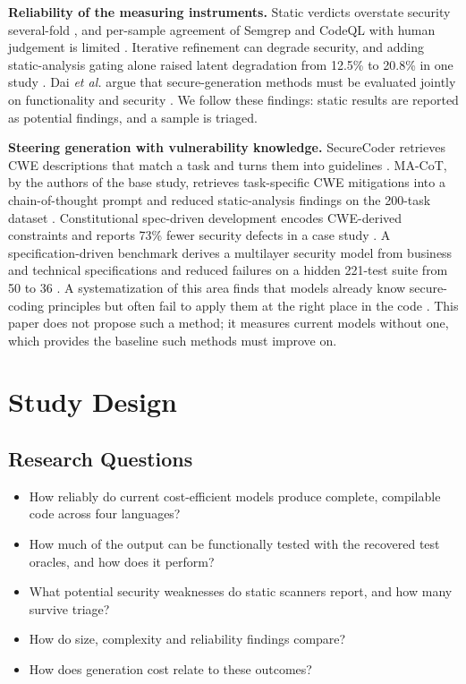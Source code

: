 \documentclass[conference]{IEEEtran}
\begin{document}
\textbf{Reliability of the measuring instruments.} Static verdicts overstate
security several-fold \cite{tessa2026}, and per-sample agreement of Semgrep and
CodeQL with human judgement is limited \cite{firouzi2026}. Iterative refinement
can degrade security, and adding static-analysis gating alone raised latent
degradation from 12.5\% to 20.8\% in one study \cite{scaffold2026}. Dai
\textit{et al.} argue that secure-generation methods must be evaluated jointly
on functionality and security \cite{dai2025}. We follow these findings: static
results are reported as potential findings, and a sample is triaged.

\textbf{Steering generation with vulnerability knowledge.} SecureCoder
retrieves CWE descriptions that match a task and turns them into guidelines
\cite{securecoder2025}. MA-CoT, by the authors of the base study, retrieves
task-specific CWE mitigations into a chain-of-thought prompt and reduced
static-analysis findings on the 200-task dataset \cite{macot2026}.
Constitutional spec-driven development encodes CWE-derived constraints and
reports 73\% fewer security defects in a case study \cite{csdd2026}. A
specification-driven benchmark derives a multilayer security model from
business and technical specifications and reduced failures on a hidden 221-test
suite from 50 to 36 \cite{specdriven2026}. A systematization of this area finds
that models already know secure-coding principles but often fail to apply them
at the right place in the code \cite{sok2026}. This paper does not propose such
a method; it measures current models without one, which provides the baseline
such methods must improve on.

\section{Study Design}

\subsection{Research Questions}
\begin{itemize}
\item[\textbf{RQ1}] How reliably do current cost-efficient models produce
complete, compilable code across four languages?
\item[\textbf{RQ2}] How much of the output can be functionally tested with the
recovered test oracles, and how does it perform?
\item[\textbf{RQ3}] What potential security weaknesses do static scanners
report, and how many survive triage?
\item[\textbf{RQ4}] How do size, complexity and reliability findings compare?
\item[\textbf{RQ5}] How does generation cost relate to these outcomes?
\end{itemize}
\end{document}
